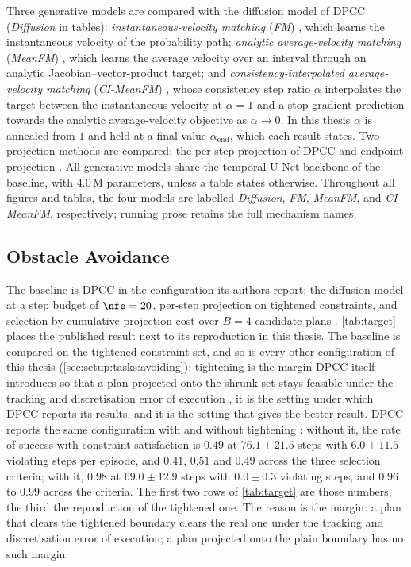 Three generative models are compared with the diffusion model of \ac{DPCC} (\emph{Diffusion} in tables):
\emph{instantaneous-velocity matching} (\emph{FM}) \parencite{lipman2023flow}, which learns the
instantaneous velocity of the probability path; \emph{analytic average-velocity matching}
(\emph{MeanFM}) \parencite{geng2025meanflow}, which learns the average velocity over an interval through
an analytic Jacobian--vector-product target; and \emph{consistency-interpolated average-velocity
matching} (\emph{CI-MeanFM}) \parencite{zhang2025alphaflow}, whose consistency step ratio $\alpha$
interpolates the target between the instantaneous velocity at $\alpha=1$ and a stop-gradient prediction
towards the analytic average-velocity objective as $\alpha\to0$. In this thesis $\alpha$ is annealed from
$1$ and held at a final value
$\alpha_{\mathrm{end}}$, which each result states. Two projection methods are compared: the per-step projection of
\ac{DPCC} and endpoint projection \parencite{li2025hardflow}. All generative models share the temporal
U-Net backbone of the baseline, with $4.0$\,M parameters, unless a table states otherwise. Throughout
all figures and tables, the four models are labelled \emph{Diffusion}, \emph{FM}, \emph{MeanFM}, and
\emph{CI-MeanFM}, respectively; running prose retains the full mechanism names.

\subsection{Obstacle Avoidance}\label{sec:setup:baselines:avoiding}

The baseline is \ac{DPCC} in the configuration its authors report: the diffusion model at a step budget
of $\nfe=20$, per-step projection on tightened constraints, and selection by
cumulative projection cost over $B=4$ candidate plans \parencite[Sec.~6.1]{romer2025diffusion}.
\autoref{tab:target} places the published result next to its reproduction in this thesis. The baseline is
compared on the tightened constraint set, and so is every other configuration of this thesis
(\autoref{sec:setup:tasks:avoiding}): tightening is the margin \ac{DPCC} itself introduces so that a plan
projected onto the shrunk set stays feasible under the tracking and discretisation error of execution
\parencite[Sec.~5.3]{romer2025diffusion}, it is the setting under which \ac{DPCC} reports its results, and it
is the setting that gives the better result. \ac{DPCC} reports the same configuration with and without
tightening \parencite[Table~1 and Fig.~2]{romer2025diffusion}: without it, the rate of success with
constraint satisfaction is $0.49$ at $76.1\pm21.5$ steps with $6.0\pm11.5$ violating steps per episode,
and $0.41$, $0.51$ and $0.49$ across the three selection criteria; with it, $0.98$ at $69.0\pm12.9$ steps
with $0.0\pm0.3$ violating steps, and $0.96$ to $0.99$ across the criteria. The first two rows of
\autoref{tab:target} are those numbers, the third the reproduction of the tightened one. The
reason is the margin: a plan that clears the tightened boundary clears the real one under the tracking
and discretisation error of execution; a plan projected onto the plain boundary has no such margin.

